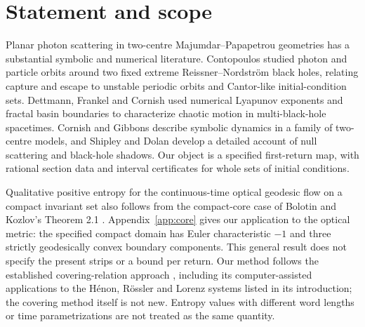 \begin{abstract}
We give explicit covering certificates for a first-return map of planar null
geodesics in an equal-mass Majumdar--Papapetrou spacetime. Both masses are one
and their coordinate separation is two. Five disjoint strips in three affine
section boxes satisfy entry and exit inequalities for the first positive
upward return to $z=0$. Two interval implementations, one using binary64
Taylor enclosures and the other CAPD with 160-bit MPFR intervals, validate
the same five coverings. They share the specified model, boxes and strips;
their agreement does not independently validate that shared input.
The resulting edge shift has
spectral radius $\ph=(1+\sqrt5)/2$. Hence a compact invariant set of the return
map has topological entropy at least $\log\ph$. The contribution is a
checkable, parameter-specific certificate and a bound per return; it is not a
claim of the first rigorous proof of chaos in a two-centre spacetime.
\end{abstract}

\section{Statement and scope}

Planar photon scattering in two-centre Majumdar--Papapetrou geometries has a
substantial symbolic and numerical literature. Contopoulos \cite{Contopoulos}
studied photon and particle orbits around two fixed extreme
Reissner--Nordstr\"om black holes, relating capture and escape to unstable
periodic orbits and Cantor-like initial-condition sets. Dettmann, Frankel
and Cornish \cite{DFC} used numerical Lyapunov exponents and fractal basin
boundaries to characterize chaotic motion in multi-black-hole spacetimes.
Cornish and Gibbons
\cite{CG} describe symbolic dynamics in a family of two-centre models, and
Shipley and Dolan \cite{SD} develop a detailed account of null scattering and
black-hole shadows. Our object is a specified first-return map, with rational
section data and interval certificates for whole sets of initial conditions.

Qualitative positive entropy for the continuous-time optical geodesic flow
on a compact invariant set also follows from the compact-core case of
Bolotin and Kozlov's Theorem 2.1 \cite{BK}. Appendix~\ref{app:core} gives our
application to the optical metric: the specified compact domain has Euler
characteristic $-1$ and three strictly geodesically convex boundary
components. This general result does not specify the present strips or a
bound per return. Our method follows the established covering-relation
approach \cite{ZG}, including its computer-assisted applications to the
H\'enon, R\"ossler and Lorenz systems listed in its introduction; the covering method
itself is not new. Entropy values with different word lengths or time
parametrizations are not treated as the same quantity.

